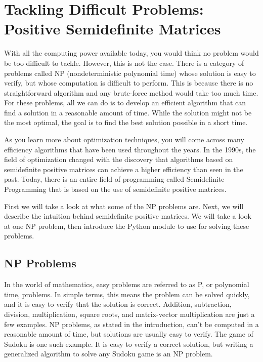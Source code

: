 \chapter{Tackling Difficult Problems: Positive Semidefinite Matrices}

With all the computing power available today, you would think no problem would be too difficult to tackle. However, this is not the case. There is a category of problems called NP (nondeterministic polynomial time) whose solution is easy to verify, but whose computation is difficult to perform. This is because there is no straightforward algorithm and any brute-force method would take too much time. For these problems, all we can do is to develop an efficient algorithm that can find a solution in a reasonable amount of time. While the solution might not be the most optimal, the goal is to find the best solution possible in a short time. 

As you learn more about optimization techniques, you will come across many efficiency algorithms that have been used throughout the years. In the 1990s, the field of optimization changed with the discovery that algorithms based on  semidefinite positive matrices can achieve a higher efficiency than seen in the past. Today, there is an entire field of programming called Semidefinite Programming that is based on the use of semidefinite positive matrices.

First we will take a look at what some of the NP problems are. Next, we will describe the intuition behind semidefinite positive matrices. We will take a look at one NP problem, then introduce the Python module to use for solving these problems. 

\section{NP Problems}

In the world of mathematics, easy problems are referred to as P, or polynomial time, problems. In simple terms, this means the problem can be solved quickly, and it is easy to verify that the solution is correct. Addition, subtraction, division, multiplication, square roots, and matrix-vector multiplication are just a few examples. NP problems, as stated in the introduction, can’t be computed in a reasonable amount of time, but solutions are usually easy to verify. The game of Sudoku is one such example. It is easy to verify a correct solution, but writing a generalized algorithm to solve any Sudoku game is an NP problem. 

